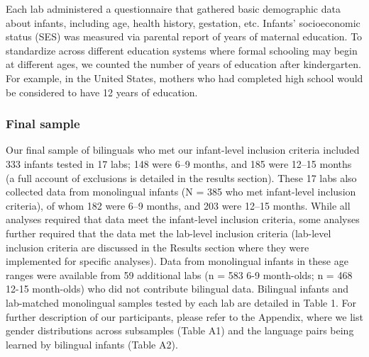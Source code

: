 \documentclass[
  english,
  ,man,floatsintext]{apa6}
\begin{document}
Each lab administered a questionnaire that gathered basic demographic data about infants, including age, health history, gestation, etc. Infants' socioeconomic status (SES) was measured via parental report of years of maternal education. To standardize across different education systems where formal schooling may begin at different ages, we counted the number of years of education after kindergarten. For example, in the United States, mothers who had completed high school would be considered to have 12 years of education.

\hypertarget{final-sample}{%
\subsubsection{Final sample}\label{final-sample}}

Our final sample of bilinguals who met our infant-level inclusion criteria included 333 infants tested in 17 labs; 148 were 6--9 months, and 185 were 12--15 months (a full account of exclusions is detailed in the results section). These 17 labs also collected data from monolingual infants (N = 385 who met infant-level inclusion criteria), of whom 182 were 6--9 months, and 203 were 12--15 months. While all analyses required that data meet the infant-level inclusion criteria, some analyses further required that the data met the lab-level inclusion criteria (lab-level inclusion criteria are discussed in the Results section where they were implemented for specific analyses). Data from monolingual infants in these age ranges were available from 59 additional labs (n = 583 6-9 month-olds; n = 468 12-15 month-olds) who did not contribute bilingual data. Bilingual infants and lab-matched monolingual samples tested by each lab are detailed in Table 1. For further description of our participants, please refer to the Appendix, where we list gender distributions across subsamples (Table A1) and the language pairs being learned by bilingual infants (Table A2).
\end{document}
